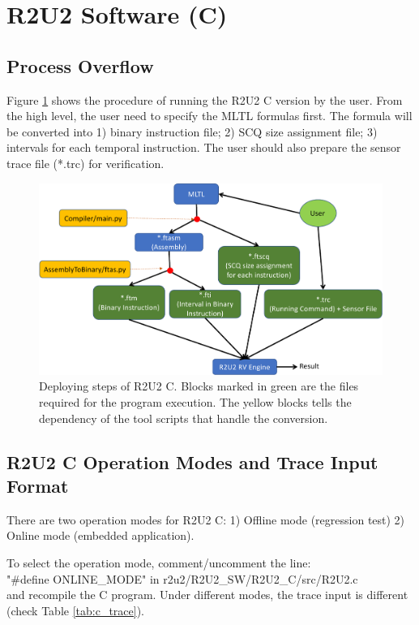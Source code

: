 \section{R2U2 Software (C)}

\subsection{Process Overflow}
Figure \ref{fig:c_flow} shows the procedure of running the R2U2 C version by the user. From the high level, the user need to specify the MLTL formulas first. The formula will be converted into 1) binary instruction file; 2) SCQ size assignment file; 3) intervals for each temporal instruction. The user should also prepare the sensor trace file (*.trc) for verification.
\begin{figure}[H]
  \includegraphics[scale=0.50]{fig/r2u2_c_flow.pdf}
  \caption{Deploying steps of R2U2 C. Blocks marked in green are the files required for the program execution. The yellow blocks tells the dependency of the tool scripts that handle the conversion.}
  \label{fig:c_flow}
\end{figure}

\subsection{R2U2 C Operation Modes and Trace Input Format}
There are two operation modes for R2U2 C: 1) Offline mode (regression test) 2) Online mode (embedded application).

To select the operation mode, comment/uncomment the line: \\
\colorbox{blue!30}{"\#define ONLINE\_MODE"} in \colorbox{gray!30}{r2u2/R2U2\_SW/R2U2\_C/src/R2U2.c}\\
and recompile the C program. Under different modes, the trace input is different (check Table \ref{tab:c_trace}).

